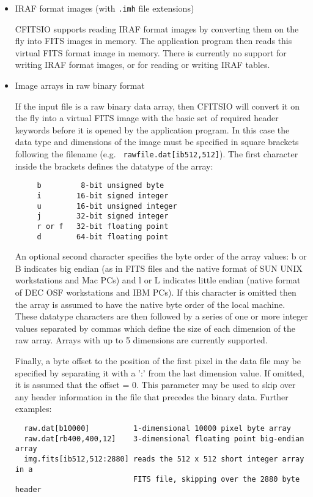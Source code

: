 \documentclass[11pt]{article}
\begin{document}
\begin{itemize}
\item  IRAF format images (with {\tt .imh} file extensions)

CFITSIO supports reading IRAF format images by converting them on the
fly into FITS images in memory.  The application program then reads
this virtual FITS format image in memory.  There is currently no
support for writing IRAF format images, or for reading or writing IRAF
tables.

\item Image arrays in raw binary format

If the input file is a raw binary data array, then CFITSIO will convert
it on the fly into a virtual FITS image with the basic set of required
header keywords before it is opened by the application program.  In
this case the data type and dimensions of the image must be specified
in square brackets following the filename (e.g. {\tt
rawfile.dat[ib512,512]}). The first character inside the brackets
defines the datatype of the array:

\begin{verbatim}
     b         8-bit unsigned byte
     i        16-bit signed integer
     u        16-bit unsigned integer
     j        32-bit signed integer
     r or f   32-bit floating point
     d        64-bit floating point
\end{verbatim}
An optional second character specifies the byte order of the array
values: b or B indicates big endian (as in FITS files and the native
format of SUN UNIX workstations and Mac PCs) and l or L indicates
little endian (native format of DEC OSF workstations and IBM PCs).  If
this character is omitted then the array is assumed to have the native
byte order of the local machine.  These datatype characters are then
followed by a series of one or more integer values separated by commas
which define the size of each dimension of the raw array.  Arrays with
up to 5 dimensions are currently supported.  

Finally, a byte offset to the position of the first pixel in the data
file may be specified by separating it with a ':' from the last
dimension value.  If omitted, it is assumed that the offset = 0.  This
parameter may be used to skip over any header information in the file
that precedes the binary data.  Further examples:
 
\begin{verbatim}
  raw.dat[b10000]          1-dimensional 10000 pixel byte array
  raw.dat[rb400,400,12]    3-dimensional floating point big-endian array
  img.fits[ib512,512:2880] reads the 512 x 512 short integer array in a
                           FITS file, skipping over the 2880 byte header
\end{verbatim}

\end{itemize}
\newpage
\end{document}
